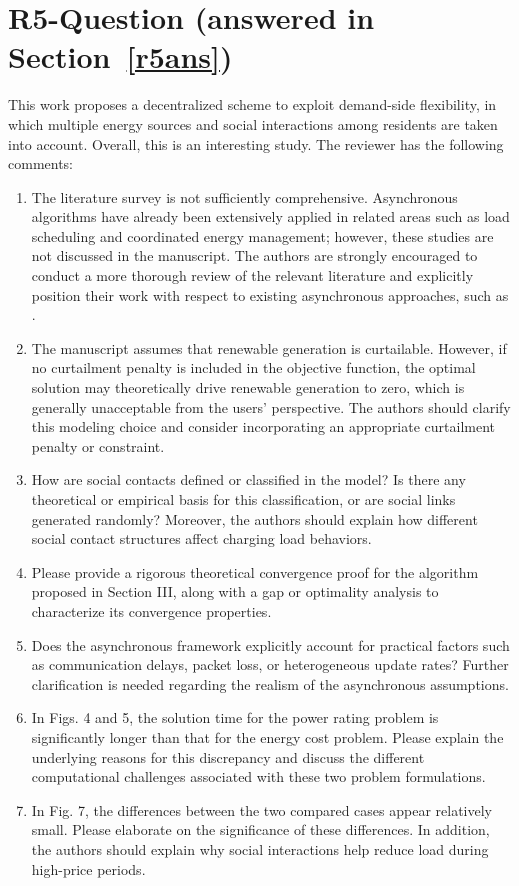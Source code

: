 \documentclass[11pt]{article}
\newcommand{\sect}[1]{\textbf{Section}~\ref{#1}}
\begin{document}
\section{R5-Question (answered in \sect{r5ans})}
This work proposes a decentralized scheme to exploit demand-side flexibility, in which multiple energy sources and social interactions among residents are taken into account. Overall, this is an interesting study. The reviewer has the following comments:
\begin{enumerate}
    \item The literature survey is not sufficiently comprehensive. Asynchronous algorithms have already been extensively applied in related areas such as load scheduling and coordinated energy management; however, these studies are not discussed in the manuscript. The authors are strongly encouraged to conduct a more thorough review of the relevant literature and explicitly position their work with respect to existing asynchronous approaches, such as \cite{wang2023}\cite{patari2023}\cite{wu2025}.
    \item The manuscript assumes that renewable generation is curtailable. However, if no curtailment penalty is included in the objective function, the optimal solution may theoretically drive renewable generation to zero, which is generally unacceptable from the users’ perspective. The authors should clarify this modeling choice and consider incorporating an appropriate curtailment penalty or constraint.
    \item How are social contacts defined or classified in the model? Is there any theoretical or empirical basis for this classification, or are social links generated randomly? Moreover, the authors should explain how different social contact structures affect charging load behaviors.
    \item Please provide a rigorous theoretical convergence proof for the algorithm proposed in Section III, along with a gap or optimality analysis to characterize its convergence properties.
    \item Does the asynchronous framework explicitly account for practical factors such as communication delays, packet loss, or heterogeneous update rates? Further clarification is needed regarding the realism of the asynchronous assumptions.
    \item In Figs. 4 and 5, the solution time for the power rating problem is significantly longer than that for the energy cost problem. Please explain the underlying reasons for this discrepancy and discuss the different computational challenges associated with these two problem formulations.
    \item In Fig. 7, the differences between the two compared cases appear relatively small. Please elaborate on the significance of these differences. In addition, the authors should explain why social interactions help reduce load during high-price periods.
\end{enumerate}
\end{document}
